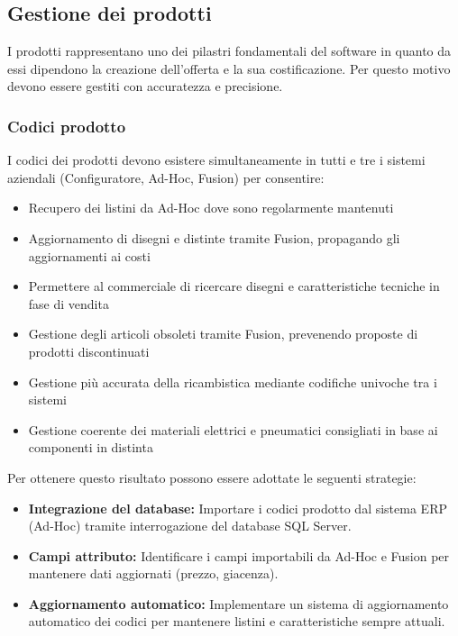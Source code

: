 \documentclass[12pt, a4paper]{article}
\begin{document}
\subsection{Gestione dei prodotti}

I prodotti rappresentano uno dei pilastri fondamentali del software in quanto da essi dipendono la creazione dell'offerta e la sua costificazione.
Per questo motivo devono essere gestiti con accuratezza e precisione.

\subsubsection{Codici prodotto}

I codici dei prodotti devono esistere simultaneamente in tutti e tre i sistemi aziendali (Configuratore, Ad-Hoc, Fusion) per consentire:

\begin{itemize}
      \item Recupero dei listini da Ad-Hoc dove sono regolarmente mantenuti
      \item Aggiornamento di disegni e distinte tramite Fusion, propagando gli aggiornamenti ai costi
      \item Permettere al commerciale di ricercare disegni e caratteristiche tecniche in fase di vendita
      \item Gestione degli articoli obsoleti tramite Fusion, prevenendo proposte di prodotti discontinuati
      \item Gestione più accurata della ricambistica mediante codifiche univoche tra i sistemi
      \item Gestione coerente dei materiali elettrici e pneumatici consigliati in base ai componenti in distinta
\end{itemize}

Per ottenere questo risultato possono essere adottate le seguenti strategie:

\begin{itemize}
      \item \textbf{Integrazione del database:} Importare i codici prodotto dal sistema ERP (Ad-Hoc) tramite interrogazione del database SQL Server.
      \item \textbf{Campi attributo:} Identificare i campi importabili da Ad-Hoc e Fusion per mantenere dati aggiornati (prezzo, giacenza).
      \item \textbf{Aggiornamento automatico:} Implementare un sistema di aggiornamento automatico dei codici per mantenere listini e caratteristiche sempre attuali.
\end{itemize}
\end{document}
